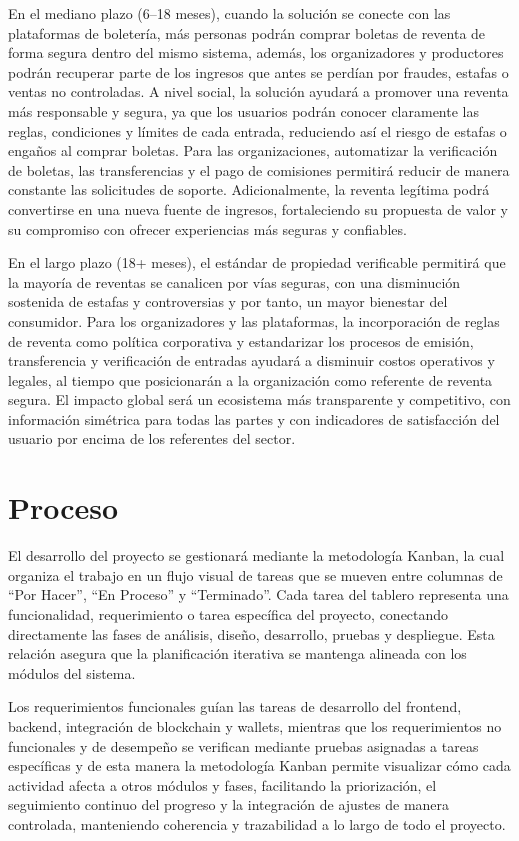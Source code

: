 \documentclass[12pt,a4paper]{article}
\begin{document}
En el mediano plazo (6–18 meses), cuando la solución se conecte con las plataformas de boletería, más personas podrán comprar boletas de reventa de forma segura dentro del mismo sistema, además, los organizadores y productores podrán recuperar parte de los ingresos que antes se perdían por fraudes, estafas o ventas no controladas. A nivel social, la solución ayudará a promover una reventa más responsable y segura, ya que los usuarios podrán conocer claramente las reglas, condiciones y límites de cada entrada, reduciendo así el riesgo de estafas o engaños al comprar boletas. Para las organizaciones, automatizar la verificación de boletas, las transferencias y el pago de comisiones permitirá reducir de manera constante las solicitudes de soporte. Adicionalmente, la reventa legítima podrá convertirse en una nueva fuente de ingresos, fortaleciendo su propuesta de valor y su compromiso con ofrecer experiencias más seguras y confiables.

En el largo plazo (18+ meses), el estándar de propiedad verificable permitirá que la mayoría de reventas se canalicen por vías seguras, con una disminución sostenida de estafas y controversias y por tanto, un mayor bienestar del consumidor. Para los organizadores y las plataformas, la incorporación de reglas de reventa como política corporativa y estandarizar los procesos de emisión, transferencia y verificación de entradas ayudará a disminuir costos operativos y legales, al tiempo que posicionarán a la organización como referente de reventa segura. El impacto global será un ecosistema más transparente y competitivo, con información simétrica para todas las partes y con indicadores de satisfacción del usuario por encima de los referentes del sector.


\section{Proceso}
El desarrollo del proyecto se gestionará mediante la metodología Kanban, la cual organiza el trabajo en un flujo visual de tareas que se mueven entre columnas de “Por Hacer”, “En Proceso” y “Terminado”. Cada tarea del tablero representa una funcionalidad, requerimiento o tarea específica del proyecto, conectando directamente las fases de análisis, diseño, desarrollo, pruebas y despliegue. Esta relación asegura que la planificación iterativa se mantenga alineada con los módulos del sistema. 

Los requerimientos funcionales guían las tareas de desarrollo del frontend, backend, integración de blockchain y wallets, mientras que los requerimientos no funcionales y de desempeño se verifican mediante pruebas asignadas a tareas específicas y de esta manera la metodología Kanban permite visualizar cómo cada actividad afecta a otros módulos y fases, facilitando la priorización, el seguimiento continuo del progreso y la integración de ajustes de manera controlada, manteniendo coherencia y trazabilidad a lo largo de todo el proyecto.
\end{document}
